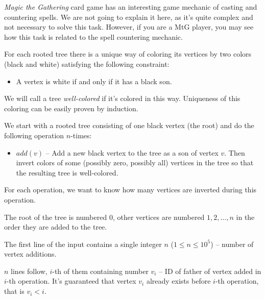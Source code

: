 





\emph{Magic the Gathering} card game has an interesting game mechanic
of casting and countering spells. We are not going to explain it here,
as it's quite complex and not necessary to solve this task. However, if 
you are a MtG player, you may see how this task is related to the spell
countering mechanic.


For each rooted tree there is a unique way of coloring its vertices by two colors
(black and white) satisfying the following constraint:
\begin{itemize}
\item A vertex is white if and only if it has a black son.
\end{itemize}

We will call a tree \emph{well-colored} if it's colored in this way.
Uniqueness of this coloring can be easily proven by induction.


We start with a rooted tree consisting of one black vertex (the root) and do
the following operation $n$-times:

\begin{itemize}
\item $add(v)$ -- Add a new black vertex to the tree as a son of vertex $v$. Then
                  invert colors of some (possibly zero, possibly all) vertices in
                  the tree so that the resulting tree is well-colored.
\end{itemize}

For each operation, we want to know how many vertices are inverted during this operation.


The root of the tree is numbered $0$, other vertices are numbered $1, 2, \dots, n$ in the 
order they are added to the tree.

The first line of the input contains a single integer $n$ ($1 \leq n \leq 10^5$) -- 
number of vertex additions.

$n$ lines follow, $i$-th of them containing number $v_i$ -- ID of father of vertex added in
$i$-th operation. It's guaranteed that vertex $v_i$ already exists before $i$-th operation,
that is $v_i < i$.

